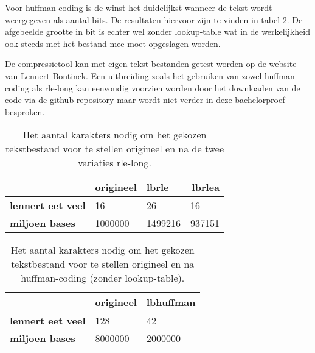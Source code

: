 Voor \gls{huffman-coding} is de winst het duidelijkst wanneer de tekst wordt weergegeven als aantal \glspl{bit}. De resultaten hiervoor zijn te vinden in tabel \ref{tab:compressietool-winst-huffman}. De afgebeelde grootte in \gls{bit} is echter wel zonder \gls{lookup-table} wat in de werkelijkheid ook steeds met het bestand mee moet opgeslagen worden.

De \gls{compressietool} kan met eigen tekst bestanden getest worden op de website van Lennert Bontinck. Een uitbreiding zoals het gebruiken van zowel \gls{huffman-coding} als \gls{rle-long} kan eenvoudig voorzien worden door het downloaden van de code via de \gls{github} repository maar wordt niet verder in deze bachelorproef besproken.

\begin{table}[h]
	\begin{tabular}{|l|l|l|l|}
		\hline
		& \textbf{origineel} & \textbf{lbrle} & \multicolumn{1}{r|}{\textbf{lbrlea}} \\ \hline
		\textbf{lennert eet veel} & 16                 & 26             & 16                                   \\ \hline
		\textbf{miljoen bases}    & 1000000            & 1499216        & 937151                               \\ \hline
	\end{tabular}
	\caption{Het aantal karakters nodig om het gekozen tekstbestand voor te stellen origineel en na de twee variaties \gls{rle-long}.}
	\label{tab:compressietool-winst-rle}
\end{table}

\begin{table}[h]
	\begin{tabular}{|l|l|l|}
		\hline
		& \textbf{origineel} & \textbf{lbhuffman} \\ \hline
		\textbf{lennert eet veel} & 128                & 42                 \\ \hline
		\textbf{miljoen bases}    & 8000000            & 2000000            \\ \hline
	\end{tabular}
	\caption{Het aantal karakters nodig om het gekozen tekstbestand voor te stellen origineel en na \gls{huffman-coding} (zonder \gls{lookup-table}).}
	\label{tab:compressietool-winst-huffman}
\end{table}
